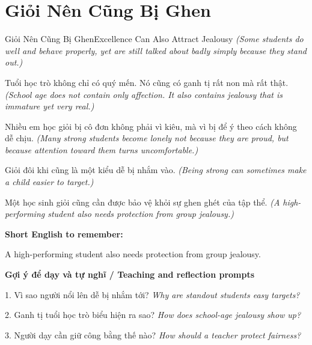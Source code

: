 \section{Giỏi Nên Cũng Bị Ghen}
\begin{truyen}{Giỏi Nên Cũng Bị Ghen}{Excellence Can Also Attract Jealousy}
\textit{(Some students do well and behave properly, yet are still talked about badly simply because they stand out.)}

Tuổi học trò không chỉ có quý mến. Nó cũng có ganh tị rất non mà rất thật.
\textit{(School age does not contain only affection. It also contains jealousy that is immature yet very real.)}

Nhiều em học giỏi bị cô đơn không phải vì kiêu, mà vì bị để ý theo cách không dễ chịu.
\textit{(Many strong students become lonely not because they are proud, but because attention toward them turns uncomfortable.)}

Giỏi đôi khi cũng là một kiểu dễ bị nhắm vào.
\textit{(Being strong can sometimes make a child easier to target.)}

\end{truyen}

\begin{baihoc}
Một học sinh giỏi cũng cần được bảo vệ khỏi sự ghen ghét của tập thể.
\textit{(A high-performing student also needs protection from group jealousy.)}
\end{baihoc}

\begin{ghinhoanh}
\textbf{Short English to remember:}

A high-performing student also needs protection from group jealousy.

\end{ghinhoanh}

\begin{tuhocnhanh}
\textbf{Gợi ý để dạy và tự nghĩ / Teaching and reflection prompts}

1. Vì sao người nổi lên dễ bị nhắm tới? \textit{Why are standout students easy targets?}

2. Ganh tị tuổi học trò biểu hiện ra sao? \textit{How does school-age jealousy show up?}

3. Người dạy cần giữ công bằng thế nào? \textit{How should a teacher protect fairness?}
\end{tuhocnhanh}
\ngancach


